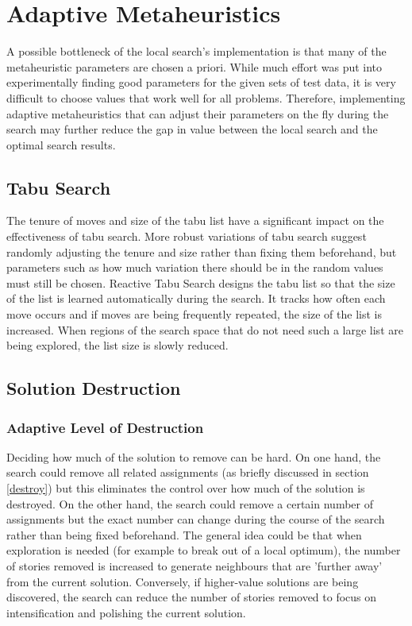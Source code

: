 \section{Adaptive Metaheuristics}

A possible bottleneck of the local search's implementation is that many of the metaheuristic parameters are chosen a priori. While much effort was put into experimentally finding good parameters for the given sets of test data, it is very difficult to choose values that work well for all problems. Therefore, implementing adaptive metaheuristics that can adjust their parameters on the fly during the search may further reduce the gap in value between the local search and the optimal search results.

\subsection{Tabu Search}
The tenure of moves and size of the tabu list have a significant impact on the effectiveness of tabu search. More robust variations of tabu search suggest randomly adjusting the tenure and size rather than fixing them beforehand, but parameters such as how much variation there should be in the random values must still be chosen. Reactive Tabu Search \citep{battiti1994reactive} designs the tabu list so that the size of the list is learned automatically during the search. It tracks how often each move occurs and if moves are being frequently repeated, the size of the list is increased. When regions of the search space that do not need such a large list are being explored, the list size is slowly reduced.

\subsection{Solution Destruction}

\subsubsection{Adaptive Level of Destruction}
Deciding how much of the solution to remove can be hard. On one hand, the search could remove all related assignments (as briefly discussed in section \ref{destroy}) but this eliminates the control over how much of the solution is destroyed. On the other hand, the search could remove a certain number of assignments but the exact number can change during the course of the search rather than being fixed beforehand. The general idea could be that when exploration is needed (for example to break out of a local optimum), the number of stories removed is increased to generate neighbours that are 'further away' from the current solution. Conversely, if higher-value solutions are being discovered, the search can reduce the number of stories removed to focus on intensification and polishing the current solution.

